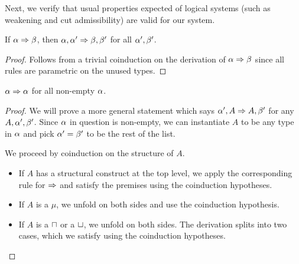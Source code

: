 Next, we verify that usual properties expected of logical systems (such as weakening and cut admissibility) are valid for our system.

\begin{lemma}[Weakening]
  \label{refinements:subtyping-weakening}
  If $\alpha \mathrel\Rightarrow \beta$, then  $\alpha, \alpha' \mathrel\Rightarrow \beta, \beta'$ for all $\alpha', \beta'$.
\end{lemma}
\begin{proof}
  Follows from a trivial coinduction on the derivation of $\alpha \mathrel\Rightarrow \beta$ since all rules are parametric on the unused types.
\end{proof}

\begin{theorem}
  \label{refinements:subtyping-identity}
  $\alpha \mathrel\Rightarrow \alpha$ for all non-empty $\alpha$.
\end{theorem}
\begin{proof}
  We will prove a more general statement which says $\alpha', A \mathrel\Rightarrow A, \beta'$ for any $A, \alpha', \beta'$. Since $\alpha$ in question is non-empty, we can instantiate $A$ to be any type in $\alpha$ and pick $\alpha' = \beta'$ to be the rest of the list.

  We proceed by coinduction on the structure of $A$.
  \begin{itemize}
    \item If $A$ has a structural construct at the top level, we apply the corresponding rule for $\mathrel\Rightarrow$ and satisfy the premises using the coinduction hypotheses.
    \item If $A$ is a $\mu$, we unfold on both sides and use the coinduction hypothesis.
    \item If $A$ is a $\mathbin{\sqcap}$ or a $\mathbin{\sqcup}$, we unfold on both sides. The derivation splits into two cases, which we satisfy using the coinduction hypotheses.
  \end{itemize}
\end{proof}

